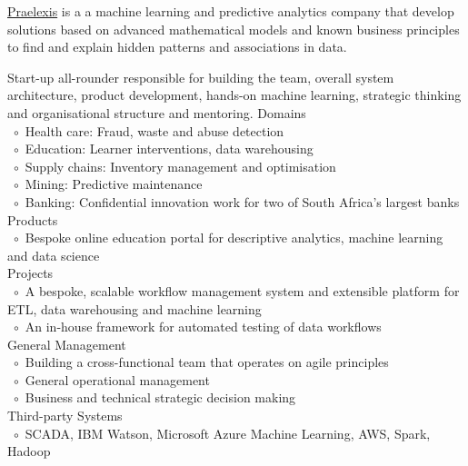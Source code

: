 \documentclass[10pt,a4paper,final]{columncv}
\newcommand{\cvitembullet}{~$\circ$~}
\newcommand{\cvitempbullet}{\phantom{\cvitembullet}}
\begin{document}
\pagebreak

\noindent \href{http://www.praelexis.com/}{Praelexis} is a a machine learning and predictive 
analytics company that develop solutions based on advanced mathematical models and known 
business principles to find and explain hidden patterns and associations in data. 

\begin{cvenv}
         {Start-up all-rounder responsible for building the team, overall system architecture,  
         product development, hands-on machine learning, strategic thinking and organisational
	       structure and mentoring.}
         {Domains \\ 
          \cvitembullet Health care: Fraud, waste and abuse detection \\
          \cvitembullet Education: Learner interventions, data warehousing \\
          \cvitembullet Supply chains: Inventory management and optimisation \\
          \cvitembullet Mining: Predictive maintenance \\
          \cvitembullet Banking: Confidential innovation work for two of South Africa's 
          \cvitempbullet largest banks \\
          Products \\
          \cvitembullet Bespoke online education portal for descriptive analytics,  
          \cvitempbullet machine learning and data science \\
          Projects \\
          \cvitembullet A bespoke, scalable workflow management system and extensible 
          \cvitempbullet platform for ETL, data warehousing and machine learning \\
          \cvitembullet An in-house framework for automated testing of data workflows \\
          General Management \\
          \cvitembullet Building a cross-functional team that operates on agile principles \\
          \cvitembullet General operational management \\
          \cvitembullet Business and technical strategic decision making \\
          Third-party Systems \\
          \cvitembullet SCADA, IBM Watson, Microsoft Azure Machine Learning, AWS,
          \cvitempbullet Spark, Hadoop
          }
\end{cvenv}
\end{document}
